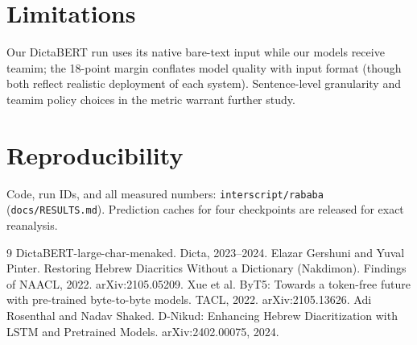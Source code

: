 \documentclass[11pt]{article}
\begin{document}
\section{Limitations}
Our DictaBERT run uses its native bare-text input while our models
receive teamim; the 18-point margin conflates model quality with input
format (though both reflect realistic deployment of each system).
Sentence-level granularity and teamim policy choices in the metric
warrant further study.

\section{Reproducibility}
Code, run IDs, and all measured numbers: \texttt{interscript/rababa}
(\texttt{docs/RESULTS.md}). Prediction caches for four checkpoints are
released for exact reanalysis.

\begin{thebibliography}{9}
 DictaBERT-large-char-menaked. Dicta, 2023--2024.
 Elazar Gershuni and Yuval Pinter. Restoring Hebrew
  Diacritics Without a Dictionary (Nakdimon). Findings of NAACL, 2022.
  arXiv:2105.05209.
 Xue et al. ByT5: Towards a token-free future with
  pre-trained byte-to-byte models. TACL, 2022. arXiv:2105.13626.
 Adi Rosenthal and Nadav Shaked. D-Nikud: Enhancing
  Hebrew Diacritization with LSTM and Pretrained Models. arXiv:2402.00075,
  2024.
\end{thebibliography}
\end{document}
